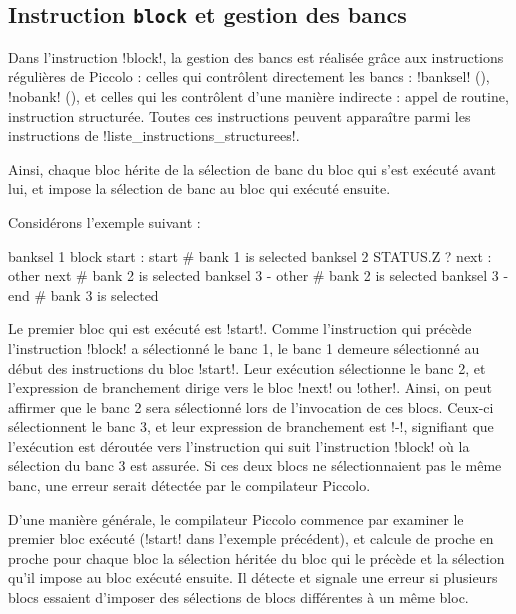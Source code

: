 \subsection{Instruction \texttt{block} et gestion des bancs}

Dans l'instruction \pic!block!, la gestion des bancs est réalisée grâce aux instructions régulières de Piccolo : celles qui contrôlent directement les bancs : \pic!banksel! (), \pic!nobank! (), et celles qui les contrôlent d'une manière indirecte : appel de routine, instruction structurée. Toutes ces instructions peuvent apparaître parmi les instructions de \pic!liste_instructions_structurees!.

Ainsi, chaque bloc hérite de la sélection de banc du bloc qui s'est exécuté avant lui, et impose la sélection de banc au bloc qui exécuté ensuite.

Considérons l'exemple suivant :

\begin{piccolo}
  banksel 1
  block start :
    start {
      # bank 1 is selected
      banksel 2
    } STATUS.Z ? next : other
    next {
      # bank 2 is selected
      banksel 3
    } -
    other {
      # bank 2 is selected
      banksel 3
    } -
  end
  # bank 3 is selected
\end{piccolo}

Le premier bloc qui est exécuté est \pic!start!. Comme l'instruction qui précède l'instruction \pic!block! a sélectionné le banc 1, le banc 1 demeure sélectionné au début des instructions du bloc \pic!start!. Leur exécution sélectionne le banc 2, et l'expression de branchement dirige vers le bloc \pic!next! ou \pic!other!. Ainsi, on peut affirmer que le banc 2 sera sélectionné lors de l'invocation de ces blocs. Ceux-ci sélectionnent le banc 3, et leur expression de branchement est \pic!-!, signifiant que l'exécution est déroutée vers l'instruction qui suit l'instruction \pic!block! où la sélection du banc 3 est assurée. Si ces deux blocs ne sélectionnaient pas le même banc, une erreur serait détectée par le compilateur Piccolo.

D'une manière générale, le compilateur Piccolo commence par examiner le premier bloc exécuté (\pic!start! dans l'exemple précédent), et calcule de proche en proche pour chaque bloc la sélection héritée du bloc qui le précède et la sélection qu'il impose au bloc exécuté ensuite. Il détecte et signale une erreur si plusieurs blocs essaient d'imposer des sélections de blocs différentes à un même bloc.













